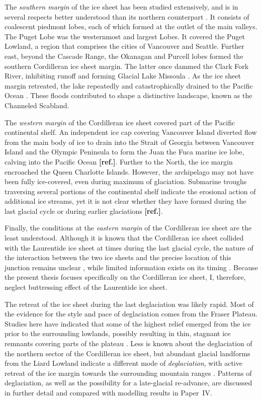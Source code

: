 \documentclass{article}
\newcommand{\mref}[0]{\textbf{[ref.]}}
\newcommand{\CCYC}[0]{Paper~IV}     %
\begin{document}
The \emph{southern margin} of the ice sheet has been studied extensively, and
is in several respects better understood than its northern counterpart
\citep{Booth.etal.2003}. It consists of coalescent piedmont
lobes, each of which formed at the outlet of the main valleys. The Puget Lobe
\citep{Thorson.1980, Porter.Swanson.1998} was the westernmost and
largest Lobes. It covered the Puget Lowland, a region that comprises
the cities of Vancouver and Seattle. Further east, beyond the Cascade Range, the
Okanagan and Purcell lobes formed the southern Cordilleran ice sheet margin. The latter once dammed the Clark Fork River, inhibiting runoff and forming
Glacial Lake Missoula \citep{Pardee.1910}. As the ice sheet margin retreated, the lake
repeatedly and catastrophically drained to the Pacific Ocean
\citep{Bretz.1923,Waitt.1980}. These floods
contributed to shape a distinctive landscape, known as the Channeled Scabland.

The \emph{western margin} of the Cordilleran ice sheet covered part of the Pacific continental
shelf. An independent
ice cap covering Vancouver Island diverted flow from the main body of ice to drain into the Strait of Georgia between Vancouver Island and the Olympic Peninsula to form the Juan the Fuca marine ice lobe, calving into the Pacific Ocean \mref.
Further to the North, the ice margin encroached the Queen Charlotte Islands. However, the
archipelago may not have been fully ice-covered, even during maximum of glaciation. Submarine troughs traversing several portions of the continental shelf indicate the erosional action of
additional ice streams, yet it is not clear whether they have formed during the
last glacial cycle or during earlier glaciations \mref.

Finally, the conditions at the \emph{eastern margin} of the Cordilleran ice sheet are the least understood.
Although it
is known that the Cordilleran ice sheet collided with the Laurentide ice sheet at times during the last glacial cycle,
the nature of the interaction between the two ice sheets and the precise
location of this junction remains unclear \citep{Gowan.2013}, while limited information exists on its
timing
    \citep[e.g.][]{Jackson.etal.1997, Bednarski.Smith.2007}.
Because the
present thesis focuses specifically on the Cordilleran ice sheet, I, therefore, neglect buttressing effect of the
Laurentide ice sheet.

The retreat of the ice sheet during the last deglaciation was likely rapid. Most of the evidence for the style and pace of deglaciation comes
from the Fraser Plateau. Studies here have indicated that some of the highest relief
emerged from the ice prior to the surrounding lowlands, possibly resulting in thin,
stagnant ice remnants covering parts of the plateau
    \citep{Fulton.1967, Fulton.1991, Margold.etal.2011, Margold.etal.2013a}.
Less is known about the deglaciation of the northern sector of the Cordilleran ice sheet, but abundant glacial landforms from the Liard Lowland indicate a
different mode of \emph{deglaciation}, with active retreat of the ice margin
towards the surrounding mountain ranges \citep{Margold.etal.2013}. Patterns of
deglaciation, as well as the possibility for a late-glacial re-advance, are
discussed in further detail and compared with modelling results in \CCYC.
\end{document}
